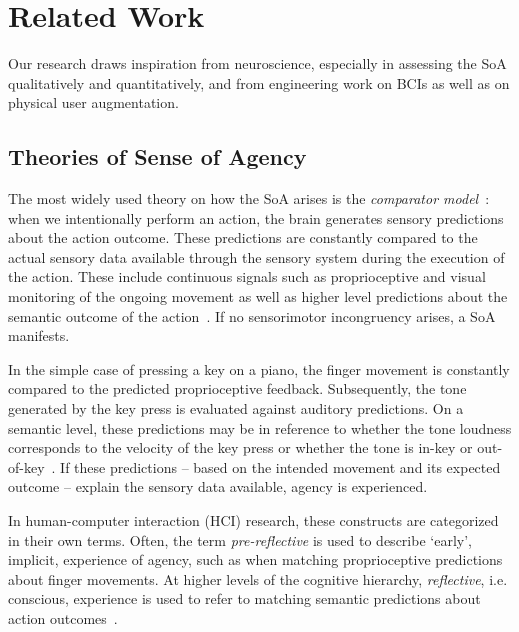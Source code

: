 \section{Related Work}
Our research draws inspiration from neuroscience, especially in assessing the SoA qualitatively and quantitatively, and from engineering work on BCIs as well as on physical user augmentation.

\subsection{Theories of Sense of Agency}
The most widely used theory on how the SoA arises is the \textit{comparator model}~\cite{Blakemore2002-dj, Frith2000-ch, Frith2006-sc}: when we intentionally perform an action, the brain generates sensory predictions about the action outcome. These predictions are constantly compared to the actual sensory data available through the sensory system during the execution of the action. These include continuous signals such as proprioceptive and visual monitoring of the ongoing movement as well as higher level predictions about the semantic outcome of the action~\cite{Clark2013-ah, Haggard2003-ff, Haggard2017-uv}. If no sensorimotor incongruency arises, a SoA manifests. 

In the simple case of pressing a key on a piano, the finger movement is constantly compared to the predicted proprioceptive feedback. Subsequently, the tone generated by the key press is evaluated against auditory predictions. On a semantic level, these predictions may be in reference to whether the tone loudness corresponds to the velocity of the key press or whether the tone is in-key or out-of-key~\cite{Pangratz2023-ew}. If these predictions -- based on the intended movement and its expected outcome -- explain the sensory data available, agency is experienced.

In human-computer interaction (HCI) research, these constructs are categorized in their own terms. Often, the term \textit{pre-reflective} is used to describe `early', implicit, experience of agency, such as when matching proprioceptive predictions about finger movements. At higher levels of the cognitive hierarchy, \textit{reflective}, i.e. conscious, experience is used to refer to matching semantic predictions about action outcomes~\cite{Danry2022-xk, Cornelio2022-aq}. 

